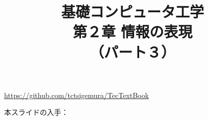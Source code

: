 \documentclass{beamer}                 %
\begin{document}
\title{基礎コンピュータ工学\\第２章 情報の表現\\（パート３）}
\date{}

\begin{frame}
  \titlepage
  \centerline{\url{https://github.com/tctsigemura/TecTextBook}}
  \vfill
  \centerline{本スライドの入手：
    }
\end{frame}

\end{document}
